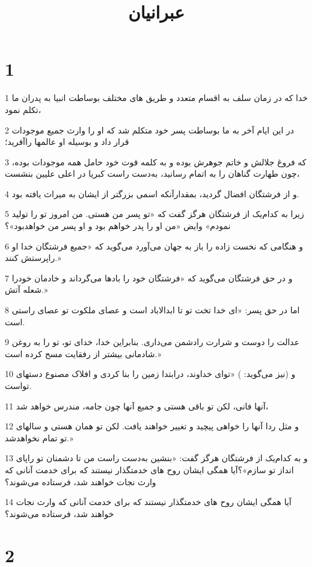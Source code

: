 

\title{عبرانيان}


\chapter{1}

\par 1 خدا که در زمان سلف به اقسام متعدد و طریق های مختلف بوساطت انبیا به پدران ما تکلم نمود،
\par 2 در این ایام آخر به ما بوساطت پسر خود متکلم شد که او را وارث جمیع موجودات قرار داد و بوسیله او عالمها راآفرید؛
\par 3 که فروغ جلالش و خاتم جوهرش بوده و به کلمه قوت خود حامل همه موجودات بوده، چون طهارت گناهان را به اتمام رسانید، به‌دست راست کبریا در اعلی علیین بنشست،
\par 4 و از فرشتگان افضال گردید، بمقدارآنکه اسمی بزرگتر از ایشان به میراث یافته بود.
\par 5 زیرا به کدام‌یک از فرشتگان هرگز گفت که «تو پسر من هستی. من امروز تو را تولید نمودم» وایض «من او را پدر خواهم بود و او پسر من خواهدبود»؟
\par 6 و هنگامی که نخست زاده را باز به جهان می‌آورد می‌گوید که «جمیع فرشتگان خدا او راپرستش کنند.»
\par 7 و در حق فرشتگان می‌گوید که «فرشتگان خود را بادها می‌گرداند و خادمان خودرا شعله آتش.»
\par 8 اما در حق پسر: «ای خدا تخت تو تا ابدالاباد است و عصای ملکوت تو عصای راستی است.
\par 9 عدالت را دوست و شرارت رادشمن می‌داری. بنابراین خدا، خدای تو، تو را به روغن شادمانی بیشتر از رفقایت مسح کرده است.»
\par 10 و (نیز می‌گوید: ) «تو‌ای خداوند، درابتدا زمین را بنا کردی و افلاک مصنوع دستهای تواست.
\par 11 آنها فانی، لکن تو باقی هستی و جمیع آنها چون جامه، مندرس خواهد شد،
\par 12 و مثل ردا آنها را خواهی پیچید و تغییر خواهند یافت. لکن تو همان هستی و سالهای تو تمام نخواهدشد.»
\par 13 و به کدام‌یک از فرشتگان هرگز گفت: «بنشین به‌دست راست من تا دشمنان تو راپای انداز تو سازم»؟آیا همگی ایشان روح های خدمتگذار نیستند که برای خدمت آنانی که وارث نجات خواهند شد، فرستاده می‌شوند؟
\par 14 آیا همگی ایشان روح های خدمتگذار نیستند که برای خدمت آنانی که وارث نجات خواهند شد، فرستاده می‌شوند؟

\chapter{2}

